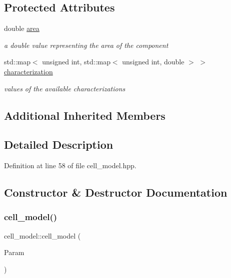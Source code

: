 \subsection*{Protected Attributes}
\begin{DoxyCompactItemize}
\item 
double \hyperlink{classcell__model_a82047940b26a7d6f10661595f620d37a}{area}
\begin{DoxyCompactList}\small\item\em a double value representing the area of the component \end{DoxyCompactList}\item 
std\+::map$<$ unsigned int, std\+::map$<$ unsigned int, double $>$ $>$ \hyperlink{classcell__model_a51e5e0da8507b025193cdaeeb6d15b38}{characterization}
\begin{DoxyCompactList}\small\item\em values of the available characterizations \end{DoxyCompactList}\end{DoxyCompactItemize}
\subsection*{Additional Inherited Members}


\subsection{Detailed Description}


Definition at line 58 of file cell\+\_\+model.\+hpp.



\subsection{Constructor \& Destructor Documentation}
\mbox{\label{classcell__model_a398010b6998e15a3b6c97db5f2fb48dd}} 
\subsubsection{\texorpdfstring{cell\+\_\+model()}{cell\_model()}\hspace{0.1cm}{\footnotesize\ttfamily [1/2]}}
{\footnotesize\ttfamily cell\+\_\+model\+::cell\+\_\+model (\begin{DoxyParamCaption}\item[{const \hyperlink{Parameter_8hpp_a37841774a6fcb479b597fdf8955eb4ea}{Parameter\+Const\+Ref} \&}]{Param }\end{DoxyParamCaption})\hspace{0.3cm}{\ttfamily [explicit]}}



